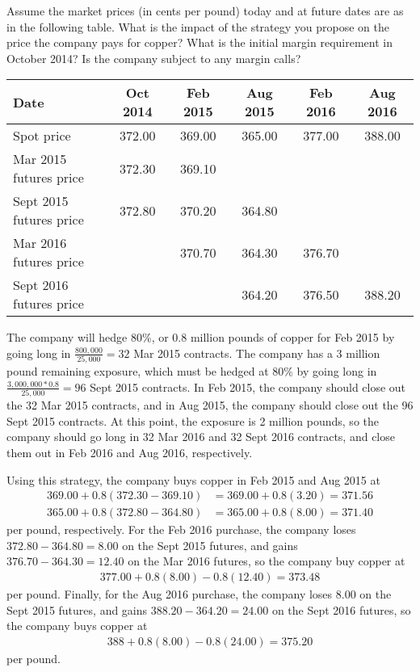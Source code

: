 \documentclass{article}
\begin{document}
\begin{itemize}
		Assume the market prices (in cents per pound) today and at future dates are as in the following table. What is the impact of the strategy you propose on the price the company pays for copper? What is the initial margin requirement in October 2014? Is the company subject to any margin calls?
		\begin{center}	
			\begin{tabular}{lccccc}
				\hline
				Date & Oct 2014 & Feb 2015 & Aug 2015 & Feb 2016 & Aug 2016 \\
				\hline
				Spot price & 372.00 & 369.00 & 365.00 & 377.00 & 388.00 \\
				Mar 2015 futures price & 372.30 & 369.10 & & & \\
				Sept 2015 futures price & 372.80 & 370.20 & 364.80 & & \\
				Mar 2016 futures price & & 370.70 & 364.30 & 376.70 & \\
				Sept 2016 futures price & & & 364.20 & 376.50 & 388.20 \\
				\hline
			\end{tabular}
		\end{center}
		\begin{soln}
			The company will hedge 80\%, or 0.8 million pounds of copper for Feb 2015 by going long in $\frac{800,000}{25, 000} = 32$ Mar 2015 contracts. The company has a 3 million pound remaining exposure, which must be hedged at 80\% by going long in $\frac{3, 000, 000*0.8}{25, 000} = 96$ Sept 2015 contracts. In Feb 2015, the company should close out the 32 Mar 2015 contracts, and in Aug 2015, the company should close out the 96 Sept 2015 contracts. At this point, the exposure is 2 million pounds, so the company should go long in 32 Mar 2016 and 32 Sept 2016 contracts, and close them out in Feb 2016 and Aug 2016, respectively. 

			Using this strategy, the company buys copper in Feb 2015 and Aug 2015 at
			\begin{align*}
				369.00 + 0.8(372.30-369.10) &= 369.00 + 0.8(3.20) = 371.56 \\
				365.00 + 0.8(372.80 - 364.80) &= 365.00 + 0.8(8.00) = 371.40
			\end{align*}
			per pound, respectively. For the Feb 2016 purchase, the company loses $372.80-364.80=8.00$ on the Sept 2015 futures, and gains $376.70-364.30=12.40$ on the Mar 2016 futures, so the company buy copper at
			\begin{align*}
				377.00 + 0.8(8.00) - 0.8(12.40) = 373.48
			\end{align*}
			per pound. Finally, for the Aug 2016 purchase, the company loses 8.00 on the Sept 2015 futures, and gains $388.20-364.20 =24.00$ on the Sept 2016 futures, so the company buys copper at
			\begin{align*}
				388 + 0.8(8.00) - 0.8(24.00) = 375.20
			\end{align*}
			per pound. 


\end{soln}
\end{itemize}
\end{document}
